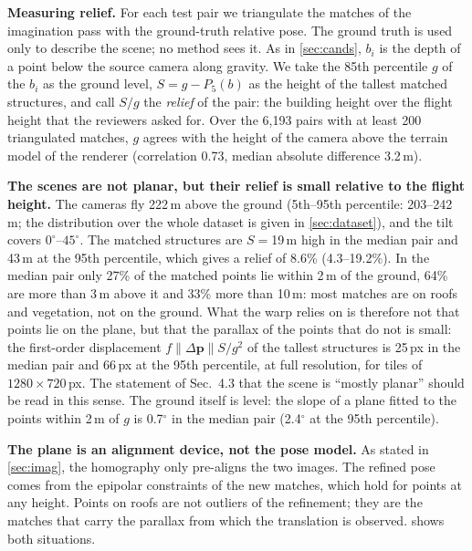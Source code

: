 \documentclass[10pt,twocolumn,letterpaper]{article}
\newcommand{\dpv}{\Delta\mathbf{p}}
\begin{document}
\noindent\textbf{Measuring relief.} For each test pair we triangulate the matches of the imagination pass with the ground-truth relative pose. The ground truth is used only to describe the scene; no method sees it. As in \cref{sec:cands}, $b_i$ is the depth of a point below the source camera along gravity. We take the 85th percentile $g$ of the $b_i$ as the ground level, $S=g-P_5(b)$ as the height of the tallest matched structures, and call $S/g$ the \emph{relief} of the pair: the building height over the flight height that the reviewers asked for. Over the 6{,}193 pairs with at least 200 triangulated matches, $g$ agrees with the height of the camera above the terrain model of the renderer (correlation 0.73, median absolute difference 3.2\,m).

\noindent\textbf{The scenes are not planar, but their relief is small relative to the flight height.} The cameras fly 222\,m above the ground (5th--95th percentile: 203--242\,m; the distribution over the whole dataset is given in \cref{sec:dataset}), and the tilt covers $0^\circ$--$45^\circ$. The matched structures are $S{=}$19\,m high in the median pair and 43\,m at the 95th percentile, which gives a relief of 8.6\% (4.3--19.2\%). In the median pair only 27\% of the matched points lie within 2\,m of the ground, 64\% are more than 3\,m above it and 33\% more than 10\,m: most matches are on roofs and vegetation, not on the ground. What the warp relies on is therefore not that points lie on the plane, but that the parallax of the points that do not is small: the first-order displacement $f\|\dpv\|S/g^2$ of the tallest structures is 25\,px in the median pair and 66\,px at the 95th percentile, at full resolution, for tiles of $1280{\times}720$\,px. The statement of Sec.~4.3 that the scene is ``mostly planar'' should be read in this sense. The ground itself is level: the slope of a plane fitted to the points within 2\,m of $g$ is 0.7$^\circ$ in the median pair (2.4$^\circ$ at the 95th percentile).

\noindent\textbf{The plane is an alignment device, not the pose model.} As stated in \cref{sec:imag}, the homography only pre-aligns the two images. The refined pose comes from the epipolar constraints of the new matches, which hold for points at any height. Points on roofs are not outliers of the refinement; they are the matches that carry the parallax from which the translation is observed.  shows both situations.
\end{document}
